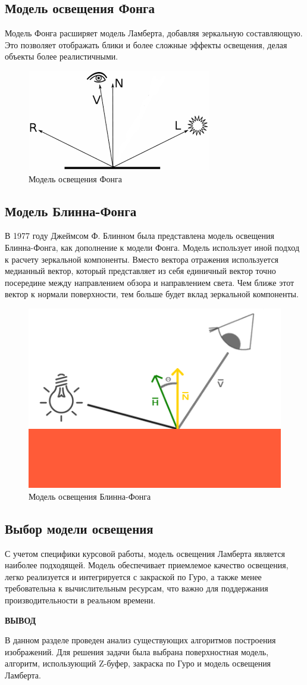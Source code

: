 \subsection{Модель освещения Фонга}

Модель Фонга расширяет модель Ламберта, добавляя зеркальную составляющую. Это позволяет отображать блики и более сложные эффекты освещения, делая объекты более реалистичными.

\begin{figure}[h]
    \centering
    \includegraphics[width=0.3\linewidth]{img/1-5-2-phong.png}
    \caption{Модель освещения Фонга}
    \label{fig:1-5-2-phong}
\end{figure}

\subsection{Модель Блинна-Фонга}

В 1977 году Джеймсом Ф. Блинном была представлена модель освещения Блинна-Фонга, как дополнение к модели Фонга. Модель использует иной подход к расчету зеркальной компоненты. Вместо вектора отражения используется медианный вектор, который представляет из себя единичный вектор точно посередине между направлением обзора и направлением света. Чем ближе этот вектор к нормали поверхности, тем больше будет вклад зеркальной компоненты.

\begin{figure}[h]
    \centering
    \includegraphics[width=0.3\linewidth]{img/1-5-3-blinnphong.png}
    \caption{Модель освещения Блинна-Фонга}
    \label{fig:1-5-2-phong}
\end{figure}

\subsection{Выбор модели освещения}

С учетом специфики курсовой работы, модель освещения Ламберта является наиболее подходящей.
Модель обеспечивает приемлемое качество освещения, легко реализуется и интегрируется с закраской по Гуро, а также менее требовательна к вычислительным ресурсам, что важно для поддержания производительности в реальном времени.

\vspace{15mm}

\textbf{ВЫВОД}

В данном разделе проведен анализ существующих алгоритмов построения изображений. Для решения задачи была выбрана поверхностная модель, алгоритм, использующий Z-буфер, закраска по Гуро и модель освещения Ламберта.